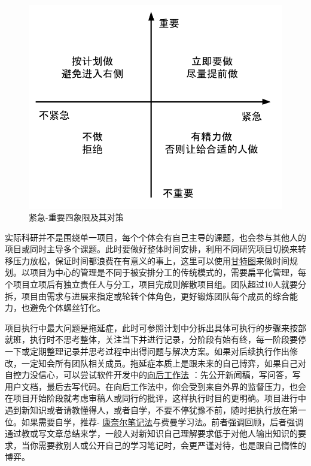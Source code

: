 \documentclass[]{tufte-book}
\begin{document}
\begin{figure}
\includegraphics{data/Eisenhower} \caption[紧急-重要四象限及其对策]{紧急-重要四象限及其对策}\label{fig:unnamed-chunk-42}
\end{figure}

实际科研并不是围绕单一项目，每个个体会有自己主导的课题，也会参与其他人的项目或同时主导多个课题。此时要做好整体时间安排，利用不同研究项目切换来转移压力放松，保证时间都浪费在有意义的事上，这里可以使用\href{https://zh.wikipedia.org/wiki/\%E7\%94\%98\%E7\%89\%B9\%E5\%9B\%BE}{甘特图}来做时间规划。以项目为中心的管理是不同于被安排分工的传统模式的，需要扁平化管理，每个项目立项后有独立责任人与分工，项目完成则解散项目组。团队超过10人就要分拆，项目由需求与进展来指定或轮转个体角色，更好锻炼团队每个成员的综合能力，也避免个体螺丝钉化。

项目执行中最大问题是拖延症，此时可参照计划中分拆出具体可执行的步骤来按部就班，执行时不思考整体，关注当下并进行记录，分阶段有始有终，每一阶段要停一下或定期整理记录并思考过程中出得问题与解决方案。如果对后续执行作出修改，一定知会所有团队相关成员。拖延症本质上是跟未来的自己博弈，如果自己对自控力没信心，可以尝试软件开发中的\href{https://www.allthingsdistributed.com/2006/11/working_backwards.html}{向后工作法} ：先公开新闻稿，写问答，写用户文档，最后去写代码。在向后工作法中，你会受到来自外界的监督压力，也会在项目开始阶段就考虑审稿人或同行的批评，这样执行时目的更明确。项目进行中遇到新知识或者请教懂得人，或者自学，不要不停犹豫不前，随时把执行放在第一位。如果需要自学，推荐- \href{https://zh.wikipedia.org/wiki/\%E5\%BA\%B7\%E5\%A5\%88\%E5\%B0\%94\%E7\%AC\%94\%E8\%AE\%B0\%E6\%B3\%95}{康奈尔笔记法}与费曼学习法。前者强调回顾，后者强调通过教或写文章总结来学，一般人对新知识自己理解要求低于对他人输出知识的要求，当你需要教别人或公开自己的学习笔记时，会更严谨对待，也是跟自己惰性的博弈。
\end{document}
